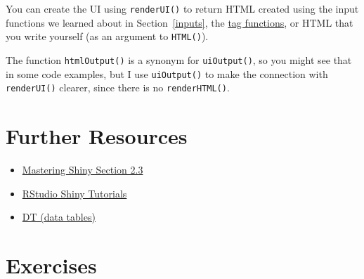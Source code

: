 \documentclass[
  oneside]{book}
\newenvironment{Shaded}{\begin{snugshade}}{\end{snugshade}}
\newcommand{\CommentTok}[1]{\textcolor[rgb]{0.56,0.35,0.01}{\textit{#1}}}
\newcommand{\DecValTok}[1]{\textcolor[rgb]{0.00,0.00,0.81}{#1}}
\newcommand{\FunctionTok}[1]{\textcolor[rgb]{0.00,0.00,0.00}{#1}}
\newcommand{\NormalTok}[1]{#1}
\newcommand{\OtherTok}[1]{\textcolor[rgb]{0.56,0.35,0.01}{#1}}
\newcommand{\SpecialCharTok}[1]{\textcolor[rgb]{0.00,0.00,0.00}{#1}}
\newcommand{\StringTok}[1]{\textcolor[rgb]{0.31,0.60,0.02}{#1}}
\providecommand{\tightlist}{%
  \setlength{\itemsep}{0pt}\setlength{\parskip}{0pt}}
\begin{document}
You can create the UI using \texttt{renderUI}\texttt{()} to return HTML created using the input functions we learned about in Section~\ref{inputs}, the \protect\hyperlink{tags}{tag functions}, or HTML that you write yourself (as an argument to \texttt{HTML}\texttt{()}).

\begin{Shaded}
\end{Shaded}

\begin{info}
The function \texttt{htmlOutput}\texttt{()} is a synonym for \texttt{uiOutput}\texttt{()}, so you might see that in some code examples, but I use \texttt{uiOutput}\texttt{()} to make the connection with \texttt{renderUI}\texttt{()} clearer, since there is no \texttt{renderHTML}\texttt{()}.

\end{info}

\hypertarget{reosurces-outputs}{%
\section{Further Resources}\label{reosurces-outputs}}

\begin{itemize}
\tightlist
\item
  \href{https://mastering-shiny.org/basic-ui.html\#outputs}{Mastering Shiny Section 2.3}
\item
  \href{https://vimeo.com/rstudioinc/review/131218530/212d8a5a7a/\#t=10m41s}{RStudio Shiny Tutorials}
\item
  \href{https://rstudio.github.io/DT/}{DT (data tables)}
\end{itemize}

\hypertarget{exercises-outputs}{%
\section{Exercises}\label{exercises-outputs}}
\end{document}
